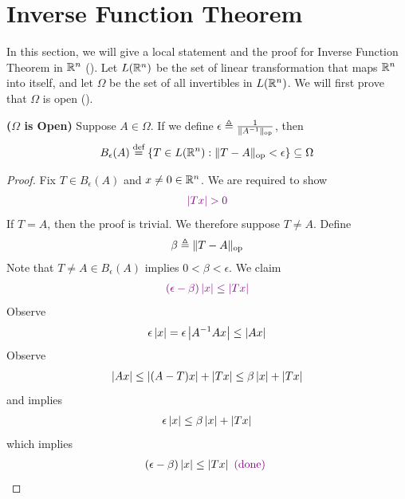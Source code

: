 \documentclass{report}
\begin{document}
\section{Inverse Function Theorem}
\begin{mdframed}
In this section, we will give a local statement and the proof for Inverse Function Theorem in  $\mathbb{R}^n$ ().  Let $L(\mathbb{R}^n)$ be the set of linear transformation that maps $\mathbb{R}^n$ into itself, and let $\Omega$ be the set of all invertibles in $L(\mathbb{R}^n)$. We will first prove that  $\Omega$ is open (). 
\end{mdframed}
\begin{theorem}
\label{SCftI}
\textbf{($\Omega$ is Open)} Suppose $A\in \Omega$. If we define $\epsilon \triangleq \frac{1}{\| A^{-1} \|_\text{op}}$, then  
\begin{align*}
B_\epsilon (A) \overset{\text{def}}{=}\{ T \in L(\mathbb{R}^n): \| T-A \|_\text{op}< \epsilon  \}\subseteq \Omega
\end{align*}
\end{theorem}
\begin{proof}
Fix $T \in B_\epsilon (A)$ and $x\neq 0\in\mathbb{R}^n$. We are required to show 
\begin{align*}
\vi{\abso{Tx}>0}
\end{align*}
If $T=A$, then the proof is trivial. We therefore suppose $T\neq A$. Define 
\begin{align*}
\beta \triangleq \| T-A \|_\text{op}
\end{align*}
Note that $T\neq A\in B_\epsilon (A)$ implies $0<\beta < \epsilon  $. We claim 
\begin{align*}
  \textcolor{violet}{(\epsilon  -\beta )\left|x\right|\leq \left|Tx\right|}
\end{align*}
Observe 
\begin{align}
\label{Obe1}
\epsilon  \left|x\right|= \epsilon  \left|A^{-1}Ax\right|\leq \left|Ax\right|
\end{align}
Observe 
\begin{align}
\label{Obe2}
\left|Ax\right|\leq \left|(A-T)x\right|+\left|Tx\right|\leq \beta \left|x\right|+ \left|Tx\right|
\end{align}
 and  implies 
\begin{align*}
\epsilon  \left|x\right|\leq \beta \left|x\right|+ \left|Tx\right|
\end{align*}
which implies 
\begin{align*}
  (\epsilon  -\beta  )\left|x\right|\leq \left|Tx\right| \textcolor{violet}{\text{ (done) }}
\end{align*}
\end{proof}
\end{document}
